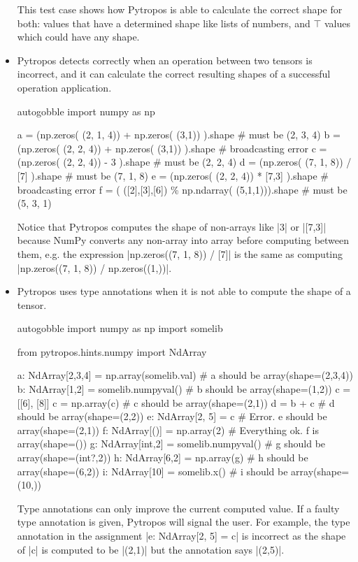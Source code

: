 \begin{itemize}
  This test case shows how Pytropos is able to calculate the correct shape for both:
  values that have a determined shape like lists of numbers, and $\top$ values which could
  have any shape.

\item Pytropos detects correctly when an operation between two tensors is incorrect, and
  it can calculate the correct resulting shapes of a successful operation application.

  \begin{pythoncode*}{autogobble}
     import numpy as np

     a = (np.zeros(  (2, 1, 4)) + np.zeros(    (3,1)) ).shape  # must be (2, 3, 4)
     b = (np.zeros(  (2, 2, 4)) + np.zeros(    (3,1)) ).shape  # broadcasting error
     c = (np.zeros(  (2, 2, 4)) - 3                   ).shape  # must be (2, 2, 4)
     d = (np.zeros(  (7, 1, 8)) / [7]                 ).shape  # must be (7, 1, 8)
     e = (np.zeros(  (2, 2, 4)) * [7,3]               ).shape  # broadcasting error
     f = (        ([2],[3],[6]) \% np.ndarray( (5,1,1))).shape  # must be (5, 3, 1)
  \end{pythoncode*}

  Notice that Pytropos computes the shape of non-arrays like \pycode|3| or \pycode|[7,3]|
  because NumPy converts any non-array into array before computing between them, e.g. the
  expression \pycode|np.zeros((7, 1, 8)) / [7]| is the same as computing
  \pycode|np.zeros((7, 1, 8)) / np.zeros((1,))|.

\item Pytropos uses type annotations when it is not able to compute the shape of a tensor.

  \begin{pythoncode*}{autogobble}
    import numpy as np
    import somelib

    from pytropos.hints.numpy import NdArray

    a: NdArray[2,3,4] = np.array(somelib.val)  # a should be array(shape=(2,3,4))
    b: NdArray[1,2] = somelib.numpyval()       # b should be array(shape=(1,2))
    c = [[6], [8]]
    c = np.array(c)                            # c should be array(shape=(2,1))
    d = b + c                                  # d should be array(shape=(2,2))
    e: NdArray[2, 5] = c                       # Error. e should be array(shape=(2,1))
    f: NdArray[()] = np.array(2)               # Everything ok. f is array(shape=())
    g: NdArray[int,2] = somelib.numpyval()     # g should be array(shape=(int?,2))
    h: NdArray[6,2] = np.array(g)              # h should be array(shape=(6,2))
    i: NdArray[10] = somelib.x()               # i should be array(shape=(10,))
  \end{pythoncode*}

  Type annotations can only improve the current computed value. If a faulty type
  annotation is given, Pytropos will signal the user. For example, the type annotation in
  the assignment \pycode|e: NdArray[2, 5] = c| is incorrect as the shape of \pycode|c| is
  computed to be \pycode|(2,1)| but the annotation says \pycode|(2,5)|.

\end{itemize}


